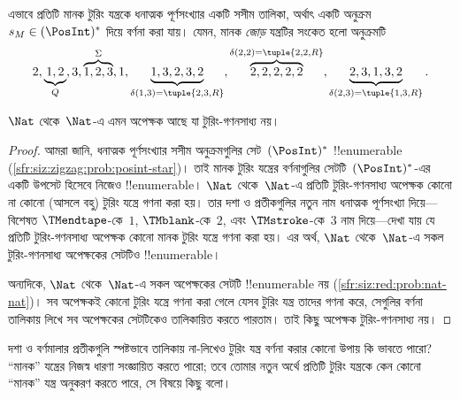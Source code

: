 \documentclass[../../../include/open-logic-section]{subfiles}
\begin{document}
\begin{explain}
এভাবে প্রতিটি মানক টুরিং যন্ত্রকে ধনাত্মক পূর্ণসংখ্যার একটি সসীম তালিকা,
অর্থাৎ একটি অনুক্রম $s_M \in (\PosInt)^*$ দিয়ে বর্ণনা করা যায়। যেমন,
মানক \emph{জোড়} যন্ত্রটির সংকেত হলো অনুক্রমটি
\[
2, \underbrace{1, 2}_Q, 3, \overbrace{1, 2, 3}^\Sigma, 1, \underbrace{1, 3, 2, 3, 2}_{\delta(1,3) = \tuple{2,3,R}}, 
\overbrace{2, 2, 2, 2, 2}^{\delta(2,2) = \tuple{2,2,R}},
\underbrace{2, 3, 1, 3, 2}_{\delta(2,3) = \tuple{1,3,R}}.
\]
\end{explain}

\begin{thm}
$\Nat$ থেকে~$\Nat$-এ এমন অপেক্ষক আছে যা টুরিং-গণনসাধ্য নয়।
\end{thm}

\begin{proof}
আমরা জানি, ধনাত্মক পূর্ণসংখ্যার সসীম অনুক্রমগুলির সেট~$(\PosInt)^*$
!!{enumerable} (\cref{sfr:siz:zigzag:prob:posint-star})। তাই মানক টুরিং
যন্ত্রের বর্ণনাগুলির সেটটি~$(\PosInt)^*$-এর একটি উপসেট হিসেবে নিজেও
!!{enumerable}। $\Nat$ থেকে~$\Nat$-এ প্রতিটি টুরিং-গণনসাধ্য অপেক্ষক কোনো
না কোনো (আসলে বহু) টুরিং যন্ত্রে গণনা করা হয়। তার দশা ও প্রতীকগুলির নতুন
নাম ধনাত্মক পূর্ণসংখ্যা দিয়ে—বিশেষত $\TMendtape$-কে~$1$,
$\TMblank$-কে~$2$, এবং $\TMstroke$-কে~$3$ নাম দিয়ে—দেখা যায় যে প্রতিটি
টুরিং-গণনসাধ্য অপেক্ষক কোনো মানক টুরিং যন্ত্রে গণনা করা হয়। এর অর্থ,
$\Nat$ থেকে~$\Nat$-এ সকল টুরিং-গণনসাধ্য অপেক্ষকের সেটটিও !!{enumerable}।

অন্যদিকে, $\Nat$ থেকে~$\Nat$-এ সকল অপেক্ষকের সেটটি !!{enumerable} নয়
(\cref{sfr:siz:red:prob:nat-nat})। সব অপেক্ষকই কোনো টুরিং যন্ত্রে গণনা
করা গেলে যেসব টুরিং যন্ত্র তাদের গণনা করে, সেগুলির বর্ণনা তালিকায় লিখে
সব অপেক্ষকের সেটটিকেও তালিকায়িত করতে পারতাম। তাই কিছু অপেক্ষক
টুরিং-গণনসাধ্য নয়। 
\end{proof}

\begin{prob}
  দশা ও বর্ণমালার প্রতীকগুলি স্পষ্টভাবে তালিকায় না-লিখেও টুরিং যন্ত্র
  বর্ণনা করার কোনো উপায় কি ভাবতে পারো? “মানক” যন্ত্রের নিজস্ব ধারণা
  সংজ্ঞায়িত করতে পারো; তবে তোমার নতুন অর্থে প্রতিটি টুরিং যন্ত্রকে কেন
  কোনো “মানক” যন্ত্র অনুকরণ করতে পারে, সে বিষয়ে কিছু বলো।
\end{prob}
\end{document}
